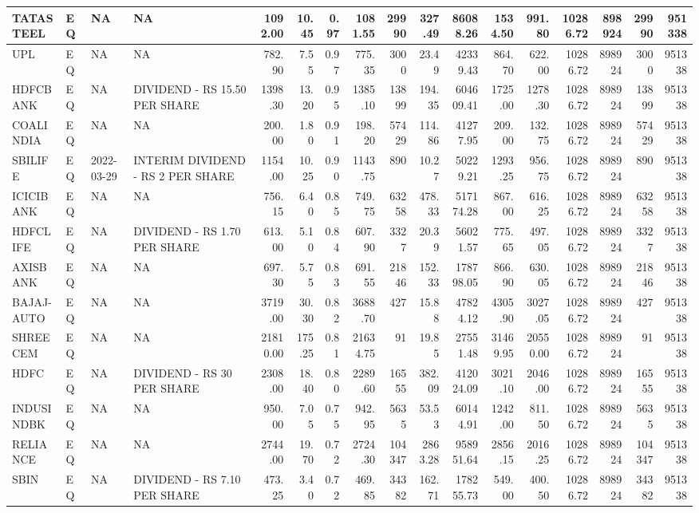 \documentclass[
]{article}
\begin{document}
\begin{table}
\begin{tabular}{l|l|l|l|r|r|r|r|r|r|r|r|r|r|r|r|r}
\hline
TATASTEEL & EQ & NA & NA & 1092.00 & 10.45 & 0.97 & 1081.55 & 29990 & 327.49 & 86088.26 & 1534.50 & 991.80 & 10286.72 & 898924 & 29990 & 951338\\
\hline
UPL & EQ & NA & NA & 782.90 & 7.55 & 0.97 & 775.35 & 3000 & 23.49 & 42339.43 & 864.70 & 622.00 & 10286.72 & 898924 & 3000 & 951338\\
\hline
HDFCBANK & EQ & NA & DIVIDEND - RS 15.50 PER SHARE & 1398.30 & 13.20 & 0.95 & 1385.10 & 13899 & 194.35 & 604609.41 & 1725.00 & 1278.30 & 10286.72 & 898924 & 13899 & 951338\\
\hline
COALINDIA & EQ & NA & NA & 200.00 & 1.80 & 0.91 & 198.20 & 57429 & 114.86 & 41277.95 & 209.00 & 132.75 & 10286.72 & 898924 & 57429 & 951338\\
\hline
SBILIFE & EQ & 2022-03-29 & INTERIM DIVIDEND - RS 2 PER SHARE & 1154.00 & 10.25 & 0.90 & 1143.75 & 890 & 10.27 & 50229.21 & 1293.25 & 956.75 & 10286.72 & 898924 & 890 & 951338\\
\hline
ICICIBANK & EQ & NA & NA & 756.15 & 6.40 & 0.85 & 749.75 & 63258 & 478.33 & 517174.28 & 867.00 & 616.25 & 10286.72 & 898924 & 63258 & 951338\\
\hline
HDFCLIFE & EQ & NA & DIVIDEND - RS 1.70 PER SHARE & 613.00 & 5.10 & 0.84 & 607.90 & 3327 & 20.39 & 56021.57 & 775.65 & 497.05 & 10286.72 & 898924 & 3327 & 951338\\
\hline
AXISBANK & EQ & NA & NA & 697.30 & 5.75 & 0.83 & 691.55 & 21846 & 152.33 & 178798.05 & 866.90 & 630.05 & 10286.72 & 898924 & 21846 & 951338\\
\hline
BAJAJ-AUTO & EQ & NA & NA & 3719.00 & 30.30 & 0.82 & 3688.70 & 427 & 15.88 & 47824.12 & 4305.90 & 3027.05 & 10286.72 & 898924 & 427 & 951338\\
\hline
SHREECEM & EQ & NA & NA & 21810.00 & 175.25 & 0.81 & 21634.75 & 91 & 19.85 & 27551.48 & 31469.95 & 20550.00 & 10286.72 & 898924 & 91 & 951338\\
\hline
HDFC & EQ & NA & DIVIDEND - RS 30 PER SHARE & 2308.00 & 18.40 & 0.80 & 2289.60 & 16555 & 382.09 & 412024.09 & 3021.10 & 2046.00 & 10286.72 & 898924 & 16555 & 951338\\
\hline
INDUSINDBK & EQ & NA & NA & 950.00 & 7.05 & 0.75 & 942.95 & 5635 & 53.53 & 60144.91 & 1242.00 & 811.50 & 10286.72 & 898924 & 5635 & 951338\\
\hline
RELIANCE & EQ & NA & NA & 2744.00 & 19.70 & 0.72 & 2724.30 & 104347 & 2863.28 & 958951.64 & 2856.15 & 2016.25 & 10286.72 & 898924 & 104347 & 951338\\
\hline
SBIN & EQ & NA & DIVIDEND - RS 7.10 PER SHARE & 473.25 & 3.40 & 0.72 & 469.85 & 34382 & 162.71 & 178255.73 & 549.00 & 400.50 & 10286.72 & 898924 & 34382 & 951338\\

\end{tabular}
\end{table}
\end{document}

